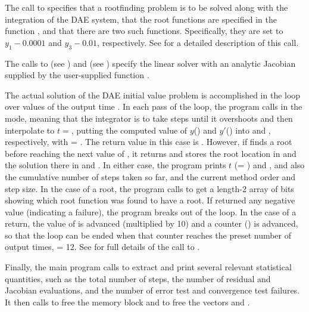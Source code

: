 The call to  specifies that a rootfinding problem
is to be solved along with the integration of the DAE system, that the
root functions are specified in the function , and that there are
two such functions.  Specifically, they are set to $y_1 - 0.0001$ and 
$y_3 - 0.01$, respectively.
See  for a detailed description of this call.

The calls to  (see ) and 
 (see ) specify the {\idadense}
linear solver with an analytic Jacobian supplied by the user-supplied function
.

The actual solution of the DAE initial value problem is accomplished in
the loop over values of the output time .  In each pass of the
loop, the program calls  in the  mode, meaning
that the integrator is to take steps until it overshoots  and then
interpolate to $t =  $, putting the computed value of $y$()
and $y'$() into  and , respectively, with
 = .  The return value in this case is .
However, if  finds a root before reaching the next value
of , it returns  and stores the root
location in  and the solution there in  and .  In
either case, the program prints $t$ (= ) and , and
also the cumulative number of steps taken so far, and the current
method order and step size.
In the case of a root, the program calls  to get a
length-2 array  of bits showing which root function was
found to have a root.  If  returned any negative value
(indicating a failure), the program breaks out of the loop.  In the
case of a  return, the value of  is advanced
(multiplied by 10) and a counter () is advanced, so that the
loop can be ended when that counter reaches the preset number of
output times,  = 12.  See  for full
details of the call to .

Finally, the main program calls  to extract and
print several relevant statistical quantities, such as the total
number of steps, the number of residual and Jacobian evaluations, and
the number of error test and convergence test failures.  It then calls
 to free the {\ida} memory block and 
to free the vectors  and .

